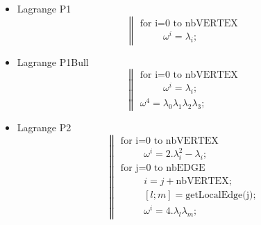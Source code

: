 \documentclass[a4paper,10pt]{article}
\begin{document}
\begin{itemize}
\item Lagrange P1
    \[
    \left\|
    \begin{array}{l}
    \text{for i=0 to nbVERTEX} \\ 
    \hspace{1cm} \omega^i = \lambda_i ;
    \end{array}
    \right.
    \]
\item Lagrange P1Bull
    \[
    \left\|
    \begin{array}{l}
    \text{for i=0 to nbVERTEX} \\ 
    \hspace{1cm} \omega^i = \lambda_i ; \\
    \omega^4 = \lambda_0 \lambda_1 \lambda_2 \lambda_3 ;
    \end{array}
    \right.
    \]
\item Lagrange P2
    \[
    \left\|
    \begin{array}{l}
    \text{for i=0 to nbVERTEX} \\ 
    \hspace{1cm} \omega^i = 2.\lambda_i^2 - \lambda_i ; \\
    \text{for j=0 to nbEDGE} \\
    \hspace{1cm}  i=j+\text{nbVERTEX};  \\
    \hspace{1cm}  [l;m]=\text{getLocalEdge(j)};  \\
    \hspace{1cm}  \omega^i = 4.\lambda_l \lambda_m ;
    \end{array}
    \right.
    \]
\end{itemize}
\end{document}
